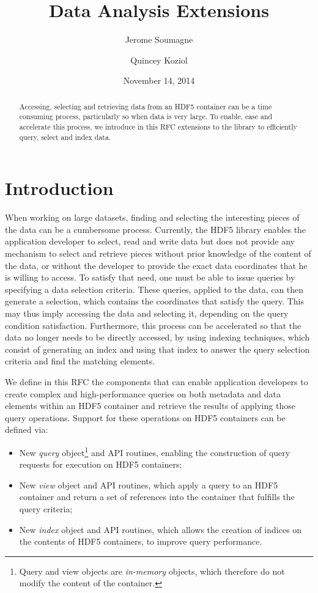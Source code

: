 \documentclass[letterpaper,hyper]{THG_RFC}
\title{Data Analysis Extensions}
\author{Jerome Soumagne}
\author{Quincey Koziol}
\date{November 14, 2014}
\begin{document}

\maketitle

\begin{abstract}
Accessing, selecting and retrieving data from an HDF5 container can be a time
consuming process, particularly so when data is very large. To enable, ease and 
accelerate this process, we introduce in this RFC extensions to the library
to efficiently query, select and index data.
\end{abstract}

\section{Introduction}
When working on large datasets, finding and selecting the interesting pieces of
the data can be a cumbersome process. Currently, the HDF5 library enables the 
application developer to select, read and write data but does not provide any 
mechanism
to select and retrieve pieces without prior knowledge of the content of the data,
or without the developer to provide the exact data
coordinates that he is willing to access. To satisfy that need, one must be able
to issue queries by specifying a data selection criteria. These queries,
applied to the data, can then generate a selection, which contains the coordinates
that satisfy the query. This may thus imply accessing the data and selecting it,
depending on the query condition satisfaction. Furthermore, this process can be 
accelerated so that the data no longer needs to be directly accessed, by using 
indexing  techniques, which consist of generating an index and using that index
to answer the query selection criteria and find the matching elements.

We define in this RFC the components that can enable application developers to
create complex and high-performance queries on both metadata and data elements
within an HDF5 container and retrieve the results of applying those query
operations. Support for these operations on HDF5 containers can be defined via:
\begin{itemize}
\item New \textit{query} object\footnote{Query and view objects are
\textit{in-memory} objects, which therefore do not modify the content of the
container.\label{fn:object}} and API routines, enabling the construction of
query requests for execution on HDF5 containers;
\item New \textit{view} object and API routines, which apply a query to an HDF5
container and return a set of references into the container that fulfills
the query criteria;
\item New \textit{index} object and API routines, which allows the creation of
indices on the contents of HDF5 containers, to improve query performance.
\end{itemize}
\end{document}
